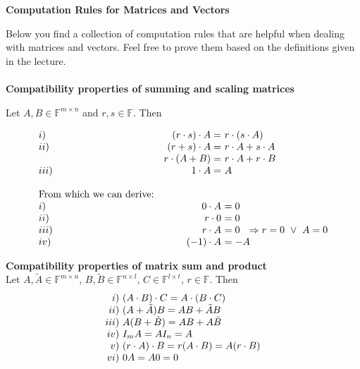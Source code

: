{\color{navy}
\textbf{\normalsize Computation Rules for Matrices and Vectors}

Below you find a collection of computation rules that are helpful when dealing with matrices and vectors. 
Feel free to prove them based on the definitions given in the lecture.\\
~\\
\textbf{Compatibility properties of summing and scaling matrices}

Let $A,B \in \mathbb{F}^{m\times n}$ and $r,s \in \mathbb{F}$. Then 

\begin{eqnarray*} 
    \begin{array}{lr@{~}l} 
        i) & (r\cdot s) \cdot A = & r\cdot(s\cdot A)  \\ 
        ii) & (r+s) \cdot A =      & r\cdot A+s\cdot A  \\ 
        ~ & r\cdot (A+B) =       & r \cdot A+r \cdot B  \\ 
        iii) & 1\cdot A = & A  \\
        &&\\
        \text{From which we can derive:}&&\\
        i)& 0 \cdot A &= 0 \\
        ii)& r \cdot 0 & = 0 \\
        iii)& r\cdot A &= 0 ~~ \Rightarrow r = 0 ~\lor ~A = 0\\ 
        iv) & (-1)\cdot A &=    -A 
    \end{array}  
\end{eqnarray*}


\textbf{Compatibility properties of matrix sum and product}\\
Let $A,\tilde{A} \in \mathbb{F}^{m\times n}$, $B, \tilde{B} \in \mathbb{F}^{n\times 
    l}$, $C \in \mathbb{F}^{l\times t}$, $r \in \mathbb{F}$. Then  
\begin{eqnarray*}
    \begin{array}{r@{~}l} 
        i) & (A\cdot B) \cdot C = A\cdot (B\cdot C)  \\ 
        ii)  & (A+\tilde{A})B = AB + \tilde{A} B\\ 
        iii)& A(B+\tilde{B}) = AB + A\tilde{B} \\ 
        iv) & I_m A = AI_n = A \\ 
        v)  & (r\cdot A)\cdot B  = r(A\cdot B) = A(r\cdot B)\\ 
        vi) & 0A = A0 = 0 
    \end{array}  
\end{eqnarray*} 


}
